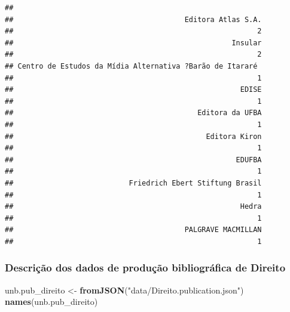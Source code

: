 \documentclass[]{article}
\newenvironment{Shaded}{\begin{snugshade}}{\end{snugshade}}
\newcommand{\KeywordTok}[1]{\textcolor[rgb]{0.13,0.29,0.53}{\textbf{#1}}}
\newcommand{\DataTypeTok}[1]{\textcolor[rgb]{0.13,0.29,0.53}{#1}}
\newcommand{\DecValTok}[1]{\textcolor[rgb]{0.00,0.00,0.81}{#1}}
\newcommand{\StringTok}[1]{\textcolor[rgb]{0.31,0.60,0.02}{#1}}
\newcommand{\OtherTok}[1]{\textcolor[rgb]{0.56,0.35,0.01}{#1}}
\newcommand{\OperatorTok}[1]{\textcolor[rgb]{0.81,0.36,0.00}{\textbf{#1}}}
\newcommand{\NormalTok}[1]{#1}
\begin{document}
\begin{Shaded}
\end{Shaded}

\begin{verbatim}
## 
##                                        Editora Atlas S.A. 
##                                                         2 
##                                                   Insular 
##                                                         2 
## Centro de Estudos da Mídia Alternativa ?Barão de Itararé  
##                                                         1 
##                                                     EDISE 
##                                                         1 
##                                           Editora da UFBA 
##                                                         1 
##                                             Editora Kiron 
##                                                         1 
##                                                    EDUFBA 
##                                                         1 
##                           Friedrich Ebert Stiftung Brasil 
##                                                         1 
##                                                     Hedra 
##                                                         1 
##                                        PALGRAVE MACMILLAN 
##                                                         1
\end{verbatim}

\subsubsection{Descrição dos dados de produção bibliográfica de
Direito}\label{descricao-dos-dados-de-producao-bibliografica-de-direito}

\begin{Shaded}
\begin{Highlighting}[]
\NormalTok{unb.pub_direito <-}\StringTok{ }\KeywordTok{fromJSON}\NormalTok{(}\StringTok{"data/Direito.publication.json"}\NormalTok{)}
\KeywordTok{names}\NormalTok{(unb.pub_direito)}
\end{Highlighting}
\end{Shaded}
\end{document}
